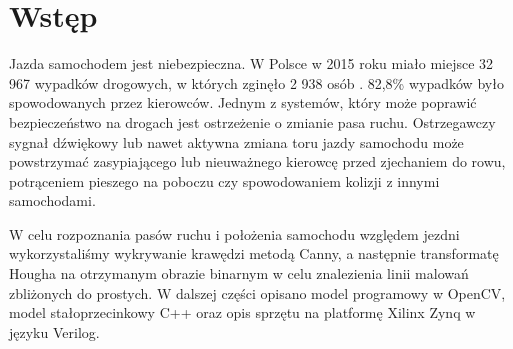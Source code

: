 \section{Wstęp}

Jazda samochodem jest niebezpieczna. W Polsce w 2015 roku miało miejsce 32 967 wypadków drogowych, w których zginęło 2 938 osób \cite{policja}. 82,8\% wypadków było spowodowanych przez kierowców.
Jednym z systemów, który może poprawić bezpieczeństwo na drogach jest ostrzeżenie o zmianie pasa ruchu. Ostrzegawczy sygnał dźwiękowy lub nawet aktywna zmiana toru jazdy samochodu może powstrzymać zasypiającego lub nieuważnego kierowcę przed zjechaniem do rowu, potrąceniem pieszego na poboczu czy spowodowaniem kolizji z innymi samochodami.

W celu rozpoznania pasów ruchu i położenia samochodu względem jezdni wykorzystaliśmy wykrywanie krawędzi metodą Canny, a następnie transformatę Hougha na otrzymanym obrazie binarnym w celu znalezienia linii malowań zbliżonych do prostych. W dalszej części opisano model programowy w OpenCV, model stałoprzecinkowy C++ oraz opis sprzętu na platformę Xilinx Zynq w języku Verilog.

